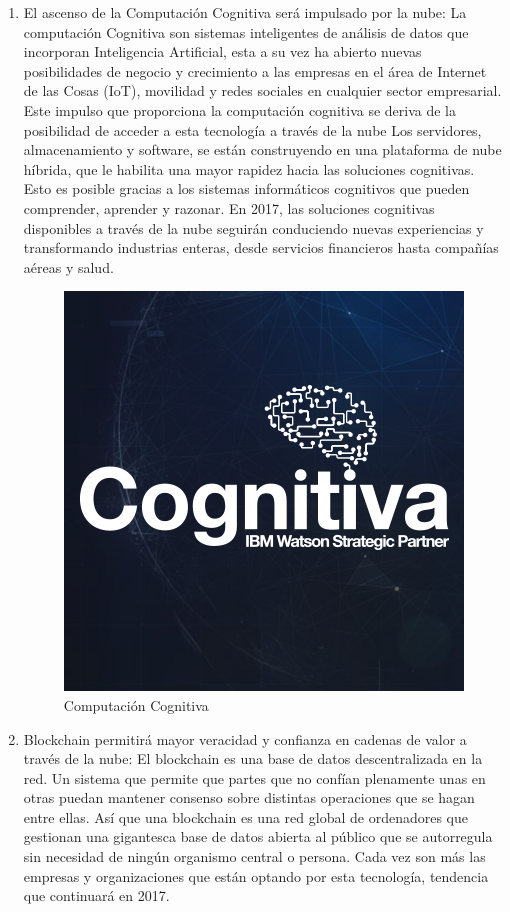 \documentclass[a4paper, 12pt]{report}
\begin{document}
\begin{justify}
\begin{enumerate}[label=\alph*)]
    \item{El ascenso de la Computación Cognitiva ser\'a impulsado por la nube:} La computaci\'on Cognitiva son sistemas inteligentes de an\'alisis de datos que incorporan Inteligencia Artificial, esta a su vez ha abierto nuevas posibilidades de negocio y crecimiento a las empresas en el \'area de Internet de las Cosas (IoT), movilidad y redes sociales en cualquier sector empresarial. Este impulso que proporciona la computaci\'on cognitiva se deriva de la posibilidad de acceder a esta tecnolog\'ia a trav\'es de la nube Los servidores, almacenamiento y software, se est\'an construyendo en una plataforma de nube h\'ibrida, que le habilita una mayor rapidez hacia las soluciones cognitivas. Esto es posible gracias a los sistemas inform\'aticos cognitivos que pueden comprender, aprender y razonar. En 2017, las soluciones cognitivas disponibles a través de la nube seguir\'an conduciendo nuevas experiencias y transformando industrias enteras, desde servicios financieros hasta compa\~n\'ias a\'ereas y salud.
		
		\begin{figure}[ht]
	\begin{center}
		\includegraphics[width=.8\textwidth]{computacionCognitiva}
		\caption{Computaci\'on Cognitiva}
		\label{fig:computacionCognitiva}
	\end{center}
\end{figure}
		
    \item{Blockchain permitir\'a mayor veracidad y confianza en cadenas de valor a trav\'es de la nube:} El blockchain es una base de datos descentralizada en la red. Un sistema que permite que partes que no conf\'ian plenamente unas en otras puedan mantener consenso sobre distintas operaciones que se hagan entre ellas. As\'i que una blockchain es una red global de ordenadores que gestionan una gigantesca base de datos abierta al p\'ublico que se autorregula sin necesidad de ning\'un organismo central o persona. Cada vez son m\'as las empresas y organizaciones que est\'an optando por esta tecnolog\'ia, tendencia que continuar\'a en 2017.
		

\end{enumerate}
\end{justify}
\end{document}
